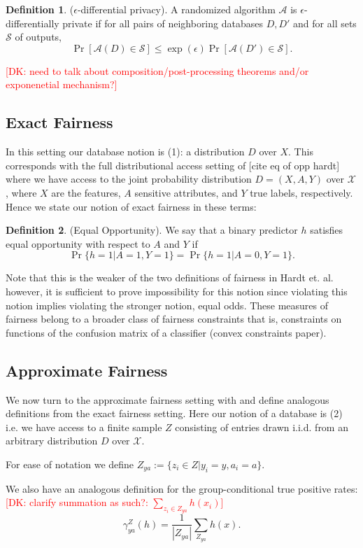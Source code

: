 \documentclass[format = sigconf]{acmart}
\newcommand{\dk}[1]{\textcolor{red}{[DK: #1]}}
\newcommand{\A}{\mathcal{A}}
\newcommand{\X}{\mathcal{X}}
\renewcommand{\S}{\mathcal{S}}
\newcommand{\1}{\mathbbm{1}}
\newcommand{\eps}{\epsilon}
\newcommand{\zya}{Z_{ya}}
\theoremstyle{definition}
\newtheorem{defn}{Definition}[section]
\begin{document}
\begin{defn}
($\eps$-differential privacy). A randomized algorithm $\A$ is $\eps$-differentially private if for all pairs of neighboring databases $D,D'$ and for all sets $\S$ of outputs,
	$$\Pr[\A(D)\in \S] \leq \exp(\eps)\Pr[\A(D')\in \S].$$
\end{defn}
\dk{need to talk about composition/post-processing theorems and/or exponenetial mechanism?}
\subsection{Exact Fairness}

In this setting our database notion is (1): a distribution $D$ over $X$. This corresponds with the full distributional access setting of [cite eq of opp hardt] where we have access to the joint probability distribution $D = (X, A, Y)$ over $\X$, where $X$ are the features, $A$ sensitive attributes, and $Y$ true labels, respectively. Hence we state our notion of exact fairness in these terms:

\begin{defn}
	 (Equal Opportunity). We say that a binary predictor $h$ satisfies equal opportunity with respect to $A$ and $Y$ if
	$$\Pr\{h = 1 | A =1, Y=1\} = \Pr\{h = 1 | A=0, Y=1\}.$$
\end{defn}

Note that this is the weaker of the two definitions of fairness in Hardt et. al. however, it is sufficient to prove impossibility for this notion since violating this notion implies violating the stronger notion, equal odds. These measures of fairness belong to a broader class of fairness constraints that is, constraints on functions of the confusion matrix of a classifier (convex constraints paper). 

\subsection{Approximate Fairness}
We now turn to the approximate fairness setting with and define analogous definitions from the exact fairness setting. Here our notion of a database is (2) i.e. we have access to a finite sample $Z$ consisting of entries drawn i.i.d. from an arbitrary distribution $D$ over $\X$. 

For ease of notation we define $\zya := \{z_i \in Z | y_i = y, a_i = a \}$.

We also have an analogous definition for the group-conditional true positive rates: \dk {clarify summation as such?: $\sum_{z_i \in \zya} h(x_i)$}
$$\gamma_{ya}^Z(h) = \frac{1}{|\zya|} \sum_{\zya} h(x).$$
\end{document}
